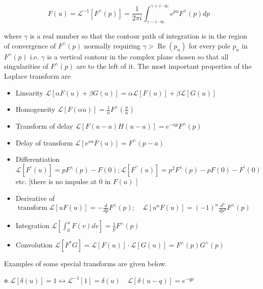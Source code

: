 \documentclass[10pt]{article}
\begin{document}
$$
F(u)=\mathcal{L}^{-1}\left[F^{\wedge}(p)\right]=\frac{1}{2 \pi i} \int_{\gamma-i \cdot \infty}^{\gamma+i \cdot \infty} e^{p u} F^{\wedge}(p) d p
$$

where $\gamma$ is a real number so that the contour path of integration is in the region of convergence of $F^{\wedge}(p)$ normally requiring $\gamma>\operatorname{Re}\left(p_{n}\right)$ for every pole $p_{n}$ in $F^{\wedge}(p)$ i.e. $\gamma$ is a vertical contour in the complex plane chosen so that all singularities of $F^{\wedge}(p)$ are to the left of it. The most important properties of the Laplace transform are

\begin{itemize}
  \item Linearity $\mathcal{L}[\alpha F(u)+\beta G(u)]=\alpha \mathcal{L}[F(u)]+\beta \mathcal{L}[G(u)]$

  \item Homogeneity $\mathcal{L}[F(\alpha u)]=\frac{1}{\alpha} F^{\wedge}\left(\frac{p}{\alpha}\right)$

  \item Transform of delay $\mathcal{L}[F(u-a) H(u-a)]=e^{-a p} F^{\wedge}(p)$

  \item Delay of transform $\mathcal{L}\left[e^{a u} F(u)\right]=F^{\wedge}(p-a)$

  \item Differentiation $\mathcal{L}\left[F^{\prime}(u)\right]=p F^{\wedge}(p)-F(0) ; \mathcal{L}\left[F^{\prime \prime}(u)\right]=p^{2} F^{\wedge}(p)-p F(0)-F^{\prime}(0)$ etc. [there is no impulse at 0 in $F(u)$ ]

  \item Derivative of $\operatorname{transform} \mathcal{L}[u F(u)]=-\frac{d}{d p} F^{\wedge}(p) ; \quad \mathcal{L}\left[u^{n} F(u)\right]=(-1)^{n} \frac{d^{n}}{d p^{n}} F^{\wedge}(p)$

  \item Integration $\mathcal{L}\left[\int_{0}^{u} F(v) d v\right]=\frac{1}{p} F^{\wedge}(p)$

  \item Convolution $\mathcal{L}\left[F^{*} G\right]=\mathcal{L}[F(u)] \cdot \mathcal{L}[G(u)]=F^{\wedge}(p) G^{\wedge}(p)$

\end{itemize}

Examples of some special transforms are given below.

० $\mathcal{L}[\delta(u)]=1 \longleftrightarrow \mathcal{L}^{-1}[1]=\delta(u) \quad \mathcal{L}[\delta(u-q)]=e^{-q p}$
\end{document}
